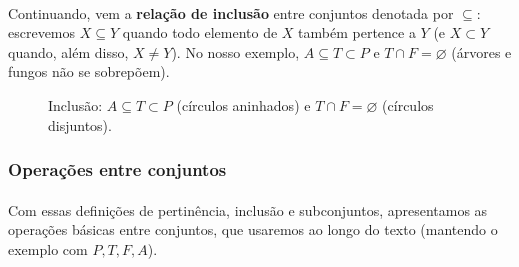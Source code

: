 \documentclass[12pt,a4paper]{article}
\begin{document}
\paragraph{}
Continuando, vem a \textbf{relação de inclusão} entre conjuntos denotada por \(\subseteq\): escrevemos \(X \subseteq Y\) quando todo elemento de \(X\) também pertence a \(Y\) (e \(X\subset Y\) quando, além disso, \(X\neq Y\)). No nosso exemplo, \(A\subseteq T\subset P\) e \(T\cap F=\varnothing\) (árvores e fungos não se sobrepõem).

\begin{figure}[htbp]
    \centering
    \caption{Inclusão: $A\subseteq T\subset P$ (círculos aninhados) e $T\cap F=\varnothing$ (círculos disjuntos).}
    \label{fig:inclusao}
\end{figure}

\subsubsection{Operações entre conjuntos}
\paragraph{}
Com essas definições de pertinência, inclusão e subconjuntos, apresentamos as operações básicas entre conjuntos, que usaremos ao longo do texto (mantendo o exemplo com \(P,T,F,A\)).
\end{document}
